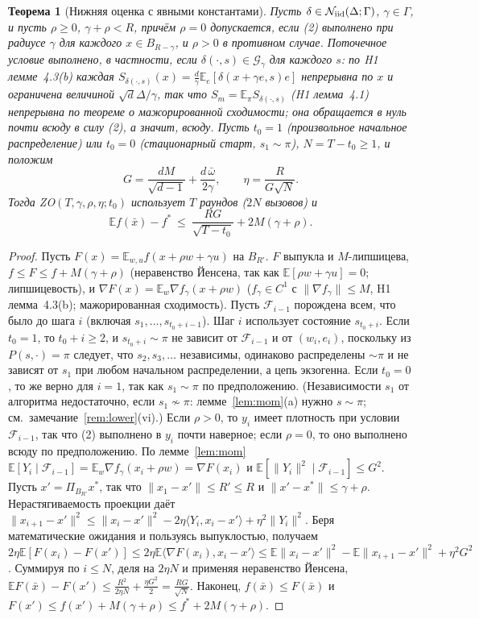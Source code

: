 \documentclass[11pt,a4paper]{article}
\numberwithin{equation}{section}
\newtheorem{theorem}{Теорема}[section]
\theoremstyle{definition}
\theoremstyle{remark}
\newcommand{\E}{\mathbb E}\newcommand{\R}{\mathbb R}\newcommand{\Z}{\mathbb Z}\let\Prob\relax\newcommand{\Prob}{\mathbb P}
\newcommand{\norm}[1]{\lVert #1\rVert}\newcommand{\abs}[1]{\lvert #1\rvert}\newcommand{\ip}[2]{\langle #1,#2\rangle}
\newcommand{\cN}{\mathcal N}\newcommand{\cA}{\mathcal A}\newcommand{\cG}{\mathcal G}\newcommand{\cF}{\mathcal F}
\newcommand{\wbar}{\bar\omega}\newcommand{\Atwo}{\cA^{\rm 2pt}_\gamma}
\begin{document}
\begin{theorem}[Нижняя оценка с явными константами]\label{thm:lower}
Пусть $\delta\in\cN_\iid(\Delta;\Gamma)$, $\gamma\in\Gamma$, и пусть $\rho\ge0$, $\gamma+\rho<R$, причём $\rho=0$ допускается, если (2) выполнено при радиусе $\gamma$ для каждого $x\in B_{R-\gamma}$, и $\rho>0$ в противном случае. Поточечное условие выполнено, в частности, если $\delta(\cdot,s)\in\cG_\gamma$ для каждого $s$: по H1 лемме~4.3(b) каждая $S_{\delta(\cdot,s)}(x)=\frac d\gamma\E_e[\delta(x+\gamma e,s)e]$ непрерывна по $x$ и ограничена величиной $\sqrt d\Delta/\gamma$, так что $S_m=\E_\pi S_{\delta(\cdot,s)}$ (H1 лемма~4.1) непрерывна по теореме о мажорированной сходимости; она обращается в нуль почти всюду в силу (2), а значит, всюду. Пусть $t_0=1$ (произвольное начальное распределение) или $t_0=0$ (стационарный старт, $s_1\sim\pi$), $N=T-t_0\ge1$, и положим
\[
G=\frac{dM}{\sqrt{d-1}}+\frac{d\,\wbar}{2\gamma},\qquad \eta=\frac{R}{G\sqrt N}.
\]
Тогда ZO$(T,\gamma,\rho,\eta;t_0)$ использует $T$ раундов ($2N$ вызовов) и
\[
\E f(\bar x)-f^*\ \le\ \frac{RG}{\sqrt{T-t_0}}+2M(\gamma+\rho).
\]
\end{theorem}
\begin{proof}
Пусть $F(x)=\E_{w,u}f(x+\rho w+\gamma u)$ на $B_{R'}$. $F$ выпукла и $M$-липшицева, $f\le F\le f+M(\gamma+\rho)$ (неравенство Йенсена, так как $\E[\rho w+\gamma u]=0$; липшицевость), и $\nabla F(x)=\E_w\nabla f_\gamma(x+\rho w)$ ($f_\gamma\in C^1$ с $\norm{\nabla f_\gamma}\le M$, H1 лемма~4.3(b); мажорированная сходимость). Пусть $\cF_{i-1}$ порождена всем, что было до шага $i$ (включая $s_1,\dots,s_{t_0+i-1}$). Шаг $i$ использует состояние $s_{t_0+i}$. Если $t_0=1$, то $t_0+i\ge2$, и $s_{t_0+i}\sim\pi$ не зависит от $\cF_{i-1}$ и от $(w_i,e_i)$, поскольку из $P(s,\cdot)=\pi$ следует, что $s_2,s_3,\dots$ независимы, одинаково распределены $\sim\pi$ и не зависят от $s_1$ при любом начальном распределении, а цепь экзогенна. Если $t_0=0$, то же верно для $i=1$, так как $s_1\sim\pi$ по предположению. (Независимости $s_1$ от алгоритма недостаточно, если $s_1\not\sim\pi$: лемме~\ref{lem:mom}(a) нужно $s\sim\pi$; см.\ замечание~\ref{rem:lower}(vi).) Если $\rho>0$, то $y_i$ имеет плотность при условии $\cF_{i-1}$, так что (2) выполнено в $y_i$ почти наверное; если $\rho=0$, то оно выполнено всюду по предположению. По лемме~\ref{lem:mom} $\E[Y_i\mid\cF_{i-1}]=\E_w\nabla f_\gamma(x_i+\rho w)=\nabla F(x_i)$ и $\E[\norm{Y_i}^2\mid\cF_{i-1}]\le G^2$.
Пусть $x'=\Pi_{B_{R'}}x^*$, так что $\norm{x_1-x'}\le R'\le R$ и $\norm{x'-x^*}\le\gamma+\rho$. Нерастягиваемость проекции даёт $\norm{x_{i+1}-x'}^2\le\norm{x_i-x'}^2-2\eta\ip{Y_i}{x_i-x'}+\eta^2\norm{Y_i}^2$. Беря математические ожидания и пользуясь выпуклостью, получаем $2\eta\E[F(x_i)-F(x')]\le2\eta\E\ip{\nabla F(x_i)}{x_i-x'}\le\E\norm{x_i-x'}^2-\E\norm{x_{i+1}-x'}^2+\eta^2G^2$. Суммируя по $i\le N$, деля на $2\eta N$ и применяя неравенство Йенсена,
$\E F(\bar x)-F(x')\le\frac{R^2}{2\eta N}+\frac{\eta G^2}2=\frac{RG}{\sqrt N}$.
Наконец, $f(\bar x)\le F(\bar x)$ и $F(x')\le f(x')+M(\gamma+\rho)\le f^*+2M(\gamma+\rho)$.
\end{proof}
\end{document}
